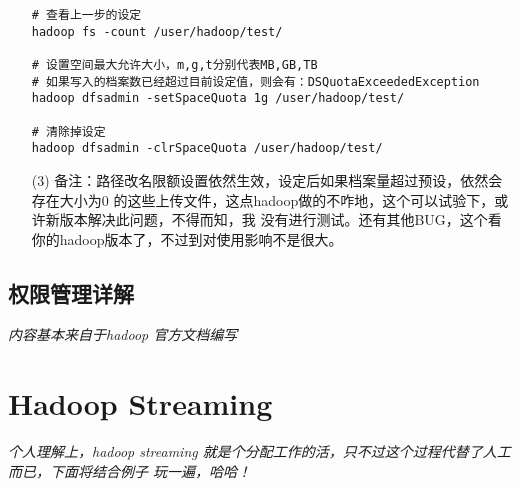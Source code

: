 \documentclass{article}
\begin{document}
\begin{itemize}
\begin{verbatim}
# 查看上一步的设定
hadoop fs -count /user/hadoop/test/

# 设置空间最大允许大小，m,g,t分别代表MB,GB,TB
# 如果写入的档案数已经超过目前设定值，则会有：DSQuotaExceededException
hadoop dfsadmin -setSpaceQuota 1g /user/hadoop/test/

# 清除掉设定
hadoop dfsadmin -clrSpaceQuota /user/hadoop/test/
\end{verbatim}

\item[(3)] 备注：路径改名限额设置依然生效，设定后如果档案量超过预设，依然会存在大小为0
的这些上传文件，这点hadoop做的不咋地，这个可以试验下，或许新版本解决此问题，不得而知，我
没有进行测试。还有其他BUG，这个看你的hadoop版本了，不过到对使用影响不是很大。

\end{itemize}

\subsection{权限管理详解}
\label{pri:1}
\textit{
内容基本来自于hadoop 官方文档编写
}




\section{Hadoop Streaming}
\textit{
个人理解上，hadoop streaming 就是个分配工作的活，只不过这个过程代替了人工而已，下面将结合例子
玩一遍，哈哈！
}
\end{document}
